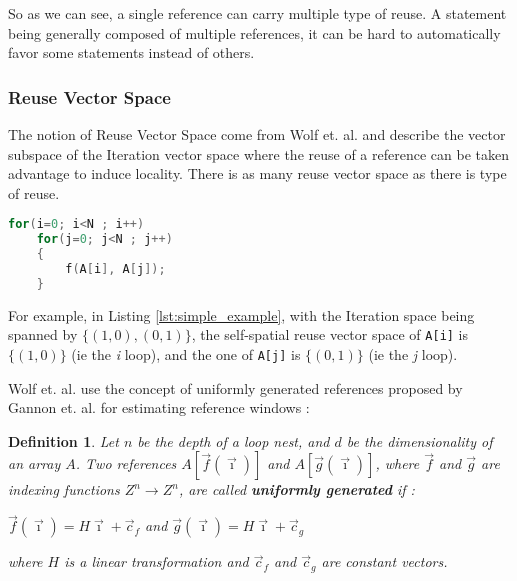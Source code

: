 \documentclass[paper=a4, fontsize=11pt]{scrartcl}
\newtheorem{defn}{Definition}[section]
\numberwithin{equation}{section}        %
\numberwithin{figure}{section}          %
\numberwithin{table}{section}               %
\begin{document}
                So as we can see, a single reference can carry multiple type of reuse.
                A statement being generally composed of multiple references, it 
                can be hard to automatically favor some statements instead of others.
        \subsubsection{Reuse Vector Space}
            The notion of Reuse Vector Space come from Wolf et. al.\cite{Wolf'91} and describe
            the vector subspace of the Iteration vector space where the reuse of
            a reference can be taken advantage to induce locality.
            There is as many reuse vector space as there is type of reuse.

\begin{lstlisting}[frame=single, language=C, caption=Simple example, label={lst:simple_example}]
for(i=0; i<N ; i++)
    for(j=0; j<N ; j++)
    {
        f(A[i], A[j]);
    }
\end{lstlisting}

            For example, in Listing \ref{lst:simple_example}, with the Iteration
            space being spanned by $\{(1,0),(0,1)\}$, the self-spatial reuse vector space of
            \verb'A[i]' is $\{(1,0)\}$ (ie the {\it i} loop), and the one of \verb'A[j]' is $\{(0,1)\}$
            (ie the {\it j} loop).

            Wolf et. al. use the concept of uniformly generated references proposed
            by Gannon et. al.\cite{Gannon:1988:SCL:50454.50460} for estimating reference
            windows :
            \begin{defn}
            \label{sec:uniformly_generated}
                Let $n$ be the depth of a loop nest, and $d$ be the dimensionality of
                an array $A$. Two references $A[\vec{f}(\vec{\imath})]$ and
                $A[\vec{g}(\vec{\imath})]$, where $\vec{f}$ and $\vec{g}$ are indexing
                functions $Z^{n} \rightarrow Z^{n}$, are called \textbf{uniformly generated} if :
                \begin{center}
                    $\vec{f}(\vec{\imath}) = H\vec{\imath}+\vec{c}_f$ and $\vec{g}(\vec{\imath}) = H\vec{\imath}+\vec{c}_g$
                \end{center}
                where $H$ is a linear transformation and $\vec{c}_f$ and $\vec{c}_g$ are constant vectors.
            \end{defn}
            
\end{document}
